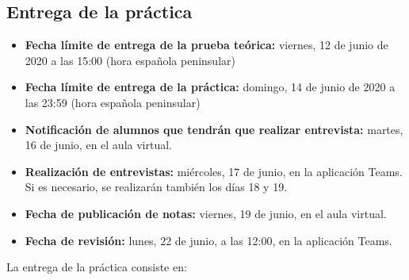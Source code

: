 \subsection{Entrega de la práctica}

\begin{itemize}
  \item \textbf{Fecha límite de entrega de la prueba teórica:} viernes, 12 de junio de 2020 a las 15:00 (hora española peninsular)

  \item \textbf{Fecha límite de entrega de la práctica:} domingo, 14 de junio de 2020 a las 23:59 (hora española peninsular)

  \item \textbf{Notificación de alumnos que tendrán que realizar entrevista:} martes, 16 de junio, en el aula virtual.

  \item \textbf{Realización de entrevistas:} miércoles, 17 de junio, en la aplicación Teams. Si es necesario, se realizarán también los días 18 y 19.
    
  \item \textbf{Fecha de publicación de notas:} viernes, 19 de junio, en el aula virtual.

  \item \textbf{Fecha de revisión:} lunes, 22 de junio, a las 12:00, en la aplicación Teams.
\end{itemize}

La entrega de la práctica consiste en:

